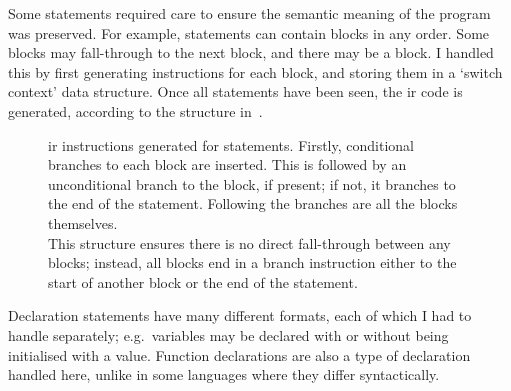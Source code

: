 \documentclass[00-main.tex]{subfiles}
\begin{document}
Some statements required care to ensure the semantic meaning of the program was preserved.
For example,  statements can contain  blocks in any order.
Some blocks may fall-through to the next block, and there may be a  block.
I handled this by first generating instructions for each  block, and storing them in a `switch context' data structure.
Once all  statements have been seen, the \gls{ir} code is generated, according to the structure in~.


\begin{figure}[t]
  \centering
  \caption{%
    \gls{ir} instructions generated for  statements.
    Firstly, conditional branches to each  block are inserted.
    This is followed by an unconditional branch to the  block, if present; if not, it branches to the end of the  statement.
    Following the branches are all the  blocks themselves. \\
    This structure ensures there is no direct fall-through between any  blocks; instead, all blocks end in a branch instruction either to the start of another block or the end of the  statement.
  }
  \label{fig:instr structure for switch statements} %
\end{figure}

Declaration statements have many different formats, each of which I had to handle separately; e.g.~variables may be declared with or without being initialised with a value.
Function declarations are also a type of declaration handled here, unlike in some languages where they differ syntactically.
\end{document}
